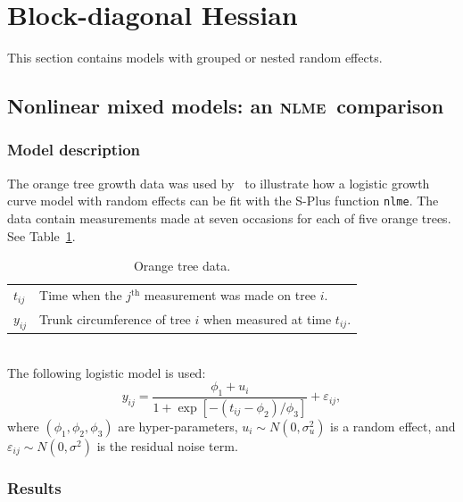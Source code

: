 \documentclass{admbmanual}
\newcommand{\citeasnoun}{\cite}
\newcommand{\scNLME}{\textsc{nlme}}
\begin{document}
\section{Block-diagonal Hessian}

This section contains models with grouped or nested random effects.

\subsection{Nonlinear mixed models: an \scNLME\ comparison}
\label{sec:orange}

\subsubsection{Model description}

The orange tree growth data was used by~\citeasnoun[Ch.~8.2]{pinh:bate:2000} to
illustrate how a logistic growth curve model with random effects can be fit with
the S-Plus function \texttt{nlme}. The data contain measurements made at seven
occasions for each of five orange trees. See Table~\ref{tab:orange-trees}.
\begin{table}[htbp]
  \begin{center}
    \begin{tabular}{ll}
      $t_{ij}$
      & Time when the $j^{\textrm{th}}$ measurement was made on tree $i$.\\
      $y_{ij}$
      & Trunk circumference of tree $i$ when measured at time $t_{ij}$.  \\
    \end{tabular}
  \end{center}
  \caption{Orange tree data.}
  \label{tab:orange-trees}
\end{table}
\\The following logistic model is used:
\[
y_{ij}=\frac{\phi_1+u_i}{1+\exp \left[ -\left(t_{ij}-\phi_2\right)
    /\phi_3\right]}+\varepsilon_{ij},
\]%
where $(\phi_1,\phi_2,\phi_3)$ are hyper-parameters,
$u_i\sim N(0,\sigma_u^2)$ is a random effect, and
$\varepsilon_{ij}\sim N(0,\sigma^2)$ is the residual noise term.

\subsubsection{Results}
\end{document}
